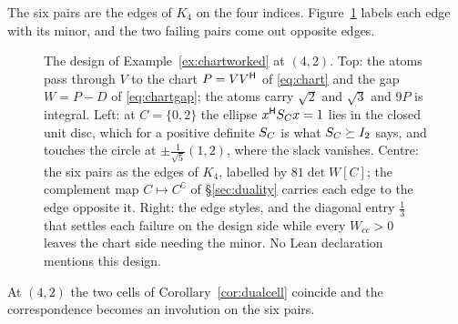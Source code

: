 The six pairs are the edges of $K_4$ on the four indices.
Figure~\ref{fig:chartworked} labels each edge with its minor, and the two
failing pairs come out opposite edges.

\begin{figure}[ht]
  \centering
  
  \caption{The design of Example~\ref{ex:chartworked} at $(4,2)$.  Top: the
  atoms pass through $V$ to the chart $P=VV^{\mathsf{H}}$ of \eqref{eq:chart} and the
  gap $W=P-D$ of \eqref{eq:chartgap}; the atoms carry $\sqrt2$ and $\sqrt3$
  and $9P$ is integral.  Left: at $C=\{0,2\}$ the ellipse $x^{\mathsf{H}}S_{C} x=1$ lies
  in the closed unit disc, which for a positive definite $S_{C}$ is what
  $S_{C}\succeq I_2$ says, and touches the circle at $\pm\tfrac1{\sqrt5}(1,2)$,
  where the slack vanishes.  Centre: the six pairs as the edges of $K_4$,
  labelled by $81\det W[C]$; the complement
  map $C\mapsto C^{\complement}$ of \S\ref{sec:duality} carries each edge to
  the edge opposite it.  Right: the edge styles, and the diagonal entry
  $\tfrac13$ that settles each failure on the design side while every
  $W_{cc}>0$ leaves the chart side needing the minor.  No Lean declaration
  mentions this design.}
  \label{fig:chartworked}
\end{figure}

At $(4,2)$ the two cells of Corollary~\ref{cor:dualcell} coincide and the
correspondence becomes an involution on the six pairs.

